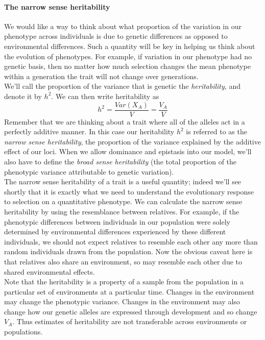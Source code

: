 \paragraph{The narrow sense heritability}
We would like a way to think about what proportion of the variation
in our phenotype across individuals is due to genetic differences as
opposed to environmental differences. Such a quantity will be key in
helping us think about the evolution of phenotypes. For example, if
variation in our phenotype had no genetic basis, then no matter how
much selection changes the mean phenotype within a generation
the trait will not change over generations. \\

We'll call the proportion of the variance that is genetic the
\textit{heritability}, and denote it by $h^2$. We can then write heritability as
\begin{equation}
h^2 = \frac{Var(X_A)}{V} = \frac{V_A}{V}
\end{equation}
Remember that we are thinking about a trait where all of the alleles act
in a perfectly additive manner. In this case our heritability $h^2$ is
referred to as the \textit{narrow sense heritability}, the proportion of the
variance explained by the additive effect of our loci.
When we allow dominance
and epistasis into our model, we'll also have to define the \textit{broad sense
heritability} (the total proportion of the phenotypic variance
attributable to genetic variation).\\

The narrow sense heritability of a trait is a useful quantity; indeed
we'll see shortly that it is exactly what we need to understand the
evolutionary response to selection on a quantitative phenotype. We can
calculate the narrow sense heritability by using the resemblance between
relatives. For example, if the phenotypic differences between individuals in our population were solely determined by environmental differences experienced by these different individuals, we
should not expect relatives to resemble each other any more than random
individuals drawn from the population. Now the obvious caveat here is
that relatives also share an environment, so may resemble each other
due to shared environmental effects. \\

Note that the heritability is a property of a sample from the population in a particular set of environments at a particular time. Changes in the environment may change the phenotypic variance. Changes in the environment may also change how our genetic alleles are expressed through development and so change $V_A$. Thus estimates of heritability are not transferable across environments or populations. 

